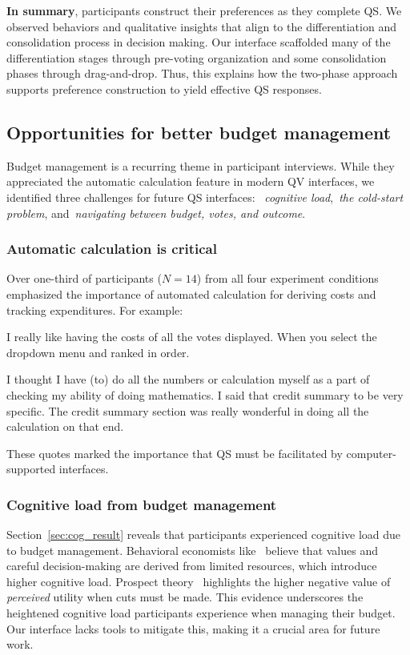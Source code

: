 \textbf{In summary}, participants construct their preferences as they complete QS. We observed behaviors and qualitative insights that align to the differentiation and consolidation process in decision making. Our interface scaffolded many of the differentiation stages through pre-voting organization and some consolidation phases through drag-and-drop. Thus, this explains how the two-phase approach supports preference construction to yield effective QS responses.

\subsection{Opportunities for better budget management}
Budget management is a recurring theme in participant interviews. While they appreciated the automatic calculation feature in modern QV interfaces, we identified three challenges for future QS interfaces: ~\textit{cognitive load},~\textit{the cold-start problem}, and~\textit{navigating between budget, votes, and outcome}.

\subsubsection{Automatic calculation is critical}
Over one-third of participants ($N=14$) from all four experiment conditions emphasized the importance of automated calculation for deriving costs and tracking expenditures. For example:

\begin{displayquote}
I really like having the costs of all the votes displayed. When you select the dropdown menu and ranked in order. \hfill{}
\end{displayquote}

\begin{displayquote}
I thought I have \bracketellipsis (to) do all the numbers or calculation myself as a part of checking my ability of doing mathematics. \bracketellipsis I said that credit summary to be very specific. The credit summary section was really wonderful in doing all the calculation on that end. \hfill{}
\end{displayquote}

These quotes marked the importance that QS must be facilitated by computer-supported interfaces.

\subsubsection{Cognitive load from budget management}
Section~\ref{sec:cog_result} reveals that participants experienced cognitive load due to budget management. Behavioral economists like~\textcite{Shah2015a} believe that values and careful decision-making are derived from limited resources, which introduce higher cognitive load. Prospect theory~\cite{kahnemanProspectTheoryAnalysis1979} highlights the higher negative value of \textit{perceived} utility when cuts must be made. This evidence underscores the heightened cognitive load participants experience when managing their budget. Our interface lacks tools to mitigate this, making it a crucial area for future work.

